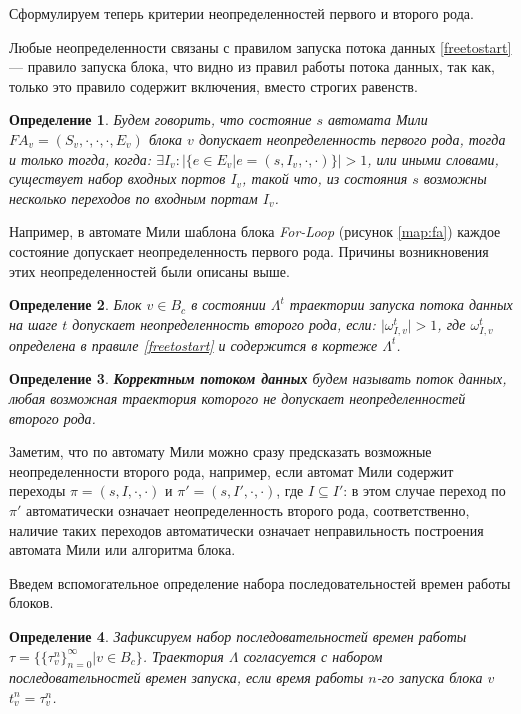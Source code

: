 \documentclass[10pt,a4paper]{article}
\newtheorem{defen}{Определение}
\newcommand{\FA}{F\!A}
\begin{document}
  Сформулируем теперь критерии неопределенностей первого и второго рода.
  
  Любые неопределенности связаны с правилом запуска потока данных \eqref{freetostart} --- правило запуска блока, что видно из правил работы потока данных, так как,
  только это правило содержит включения, вместо строгих равенств.
  \begin{defen}
    Будем говорить, что состояние $s$ автомата Мили $\FA_v = (S_v, \cdot, \cdot, \cdot, E_v)$ блока $v$ допускает неопределенность первого рода, тогда и только тогда, когда:
    $\exists I_v: \lvert \{e \in E_v \vert e = (s, I_v, \cdot, \cdot) \} \rvert > 1$, или иными словами, существует набор входных портов $I_v$, такой что, из состояния $s$ возможны
    несколько переходов по входным портам $I_v$.
  \end{defen}
  
  Например, в автомате Мили шаблона блока \textit{For-Loop} (рисунок \ref{map:fa}) каждое состояние допускает неопределенность первого рода.
  Причины возникновения этих неопределенностей были описаны выше.
 
  \begin{defen}
    Блок $v \in B_c$ в состоянии $\Lambda^t$ траектории запуска потока данных на шаге $t$ допускает неопределенность второго рода, если:
    $\lvert \omega^t_{I, v} \rvert > 1$, где $\omega^t_{I, v}$ определена в правиле \eqref{freetostart} и содержится в кортеже $\Lambda^t$.
  \end{defen}
  
  \begin{defen}
    \textbf{Корректным потоком данных} будем называть поток данных, любая возможная траектория которого не допускает неопределенностей второго рода.
  \end{defen}
  
  Заметим, что по автомату Мили можно сразу предсказать возможные неопределенности второго рода, например, если автомат Мили содержит переходы
  $\pi = (s, I, \cdot, \cdot)$ и $\pi' = (s, I', \cdot, \cdot)$,
  где $I \subseteq I'$: в этом случае переход по $\pi'$ автоматически означает неопределенность второго рода,
  соответственно, наличие таких переходов автоматически означает неправильность построения автомата Мили или алгоритма блока.
  
  Введем вспомогательное определение набора последовательностей времен работы блоков.
  \begin{defen}
    Зафиксируем набор последовательностей времен работы $\tau = \{\{\tau^n_v\}^{\infty}_{n = 0} \vert v \in B_c\}$.
    Траектория $\Lambda$ согласуется с набором последовательностей времен запуска, если время работы $n$-го запуска блока $v$ $t^n_v = \tau^n_v$.
  \end{defen}
  
\end{document}
